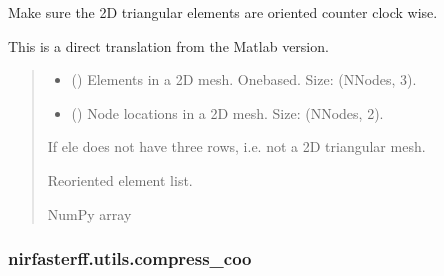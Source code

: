 \documentclass[letterpaper,10pt,english]{sphinxmanual}
\begin{document}
\begin{fulllineitems}
\label{\detokenize{_autosummary/nirfasterff.utils.check_element_orientation_2d:nirfasterff.utils.check_element_orientation_2d}}
\pysigstartsignatures
{}
\pysigstopsignatures
\sphinxAtStartPar
Make sure the 2D triangular elements are oriented counter clock wise.

\sphinxAtStartPar
This is a direct translation from the Matlab version.
\begin{quote}\begin{description}
\begin{itemize}
\item {} 
\sphinxAtStartPar
{} () \textendash{} Elements in a 2D mesh. One\sphinxhyphen{}based. Size: (NNodes, 3).

\item {} 
\sphinxAtStartPar
{} () \textendash{} Node locations in a 2D mesh. Size: (NNodes, 2).

\end{itemize}

\sphinxAtStartPar
{} \textendash{} If ele does not have three rows, i.e. not a 2D triangular mesh.

\sphinxAtStartPar
{} \textendash{} Re\sphinxhyphen{}oriented element list.

\sphinxAtStartPar
NumPy array

\end{description}\end{quote}

\end{fulllineitems}


\sphinxstepscope


\subsubsection{nirfasterff.utils.compress\_coo}
\label{\detokenize{_autosummary/nirfasterff.utils.compress_coo:nirfasterff-utils-compress-coo}}\label{\detokenize{_autosummary/nirfasterff.utils.compress_coo::doc}}
\end{document}
